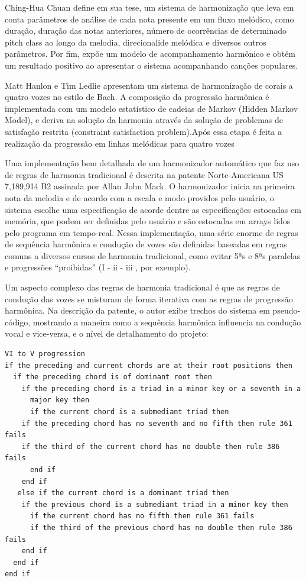 \documentclass{ppgmus}
\begin{document}

Ching-Hua Chuan define em sua tese, um sistema de harmonização que leva em conta parâmetros
de análise de cada nota presente em um fluxo melódico, como duração, duração das notas anteriores, número
de ocorrências de determinado pitch class ao longo da melodia, direcionalide melódica e diversos outros
parâmetros. Por fim, expõe um modelo de acompanhamento harmônico e obtém um resultado positivo ao apresentar
o sistema acompanhando canções populares.

Matt Hanlon e Tim Ledlie apresentam um sistema de harmonização de corais a quatro vozes no estilo de Bach.
A composição da progressão harmônica é implementada com um modelo estatístico de cadeias de Markov
(Hidden Markov Model), e deriva na solução da harmonia através da solução de problemas
de satisfação restrita (constraint satisfaction problem).Após
essa etapa é feita a realização da progressão em linhas melódicas para quatro vozes

Uma implementação bem detalhada de um harmonizador automático que faz uso de
 regras de harmonia tradicional é descrita na patente Norte-Americana 
US 7,189,914 B2  assinada por Allan John Mack. O harmonizador inicia
na primeira nota da melodia e de acordo com a escala e modo providos
pelo usuário, o sistema escolhe uma especificação de acorde dentre
as especificações estocadas em memória, que podem ser definidas pelo usuário
e são estocadas em arrays lidos pelo programa em tempo-real.
Nessa implementação, uma série enorme de regras de sequência harmônica e 
condução de vozes são definidas baseadas em regras comuns a diversos cursos
de harmonia tradicional, como evitar 5ªs e 8ªs paralelas e progressões
``proibidas'' (I - ii - iii , por exemplo).

Um aspecto complexo das regras de harmonia tradicional é que as regras
de condução das vozes se misturam de forma iterativa com as regras de
progressão harmônica. Na descrição da patente, o autor exibe trechos do sistema em pseudo-código,
mostrando a maneira como a sequência harmônica influencia na condução vocal e vice-versa,
e o nível de detalhamento do projeto:

\singlespacing
\footnotesize
\begin{verbatim}
VI to V progression
if the preceding and current chords are at their root positions then
  if the preceding chord is of dominant root then
    if the preceding chord is a triad in a minor key or a seventh in a 
      major key then
      if the current chord is a submediant triad then
	if the preceding chord has no seventh and no fifth then rule 361 fails
	if the third of the current chord has no double then rule 386 fails
      end if
    end if
   else if the current chord is a dominant triad then
    if the previous chord is a submediant triad in a minor key then
      if the current chord has no fifth then rule 361 fails
      if the third of the previous chord has no double then rule 386 fails
    end if
  end if
end if
\end{verbatim}
\normalsize
\doublespacing
\end{document}
